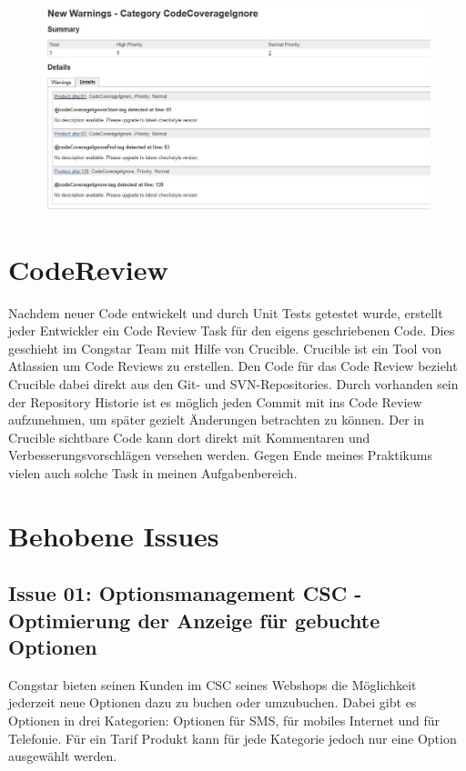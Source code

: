 \documentclass[11pt,a4paper]{article} %
\begin{document}
\begin{figure}[h]
\includegraphics[width=\textwidth]{images/resultSniffer.JPG}
\centering
\end{figure}


\section{CodeReview}

Nachdem neuer Code entwickelt und durch Unit Tests getestet wurde, erstellt jeder Entwickler ein Code Review Task 
für den eigens geschriebenen Code. Dies geschieht im Congstar Team mit Hilfe von Crucible. Crucible ist ein Tool 
von Atlassien um Code Reviews zu erstellen. Den Code für das Code Review bezieht Crucible dabei direkt
aus den Git- und SVN-Repositories. Durch vorhanden sein der Repository Historie ist es möglich jeden Commit
mit ins Code Review aufzunehmen, um später gezielt Änderungen betrachten zu können. Der in Crucible sichtbare Code
kann dort direkt mit Kommentaren und Verbesserungsvorschlägen versehen werden.
Gegen Ende meines Praktikums vielen auch solche Task in meinen Aufgabenbereich.


\section{Behobene Issues} \label{sec:issues}

\subsection{Issue 01: Optionsmanagement CSC - Optimierung der Anzeige für gebuchte Optionen}

Congstar bieten seinen Kunden im CSC seines Webshops die Möglichkeit jederzeit neue Optionen dazu zu buchen oder umzubuchen.
Dabei gibt es Optionen in drei Kategorien: Optionen für SMS, für mobiles Internet und für Telefonie.
Für ein Tarif Produkt kann für jede Kategorie jedoch nur eine Option ausgewählt werden.
\end{document}
